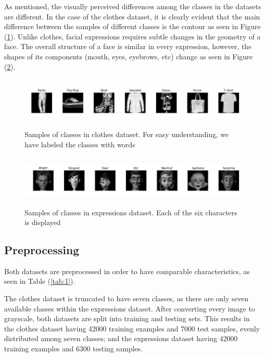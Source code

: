 \documentclass{article}
\begin{document}
As mentioned, the visually perceived differences among the classes in the datasets are different. In the case of the clothes dataset, it is clearly evident that the main difference between the samples of different classes is the contour as seen in Figure (\ref{fig:1}). Unlike clothes, facial expressions requires subtle changes in the geometry of a face. The overall structure of a face is similar in every expression, however, the shapes of its components (mouth, eyes, eyebrows, etc) change as seen in Figure (\ref{fig:2}).
\begin{figure}[tb]
	\vskip 5mm
		\begin{center}
			\includegraphics[width=\textwidth,height=2.5cm]{original_clothes}
			\caption{Samples of classes in clothes dataset. For easy understanding, we have labeled the classes with words}
			\label{fig:1}
		\end{center}
	\vskip -5mm
\end{figure}

\begin{figure}[tb]
	\vskip 5mm
		\begin{center}
			\includegraphics[width=\textwidth,height=2.5cm]{original_expressions}
			\caption{Samples of classes in expressions dataset. Each of the six characters is displayed}
			\label{fig:2}
		\end{center}
	\vskip -5mm
\end{figure}

\subsection{Preprocessing}
\label{sec:preprocessing}
Both datasets are preprocessed in order to have comparable characteristics, as seen in Table (\ref{tab:1}). 

The clothes dataset is truncated to have seven classes, as there are only seven available classes within the expressions dataset. After converting every image to grayscale, both datasets are split into training and testing sets. This results in the clothes dataset having 42000 training examples and 7000 test samples, evenly distributed among seven classes; and the expressions dataset having 42000 training examples and 6300 testing samples.
\end{document}
